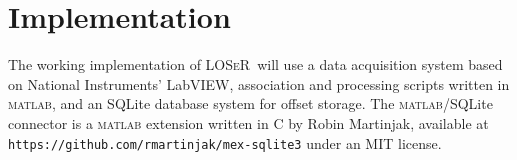 \documentclass[11pt,letterpaper]{article}
\newcommand{\loser}{\textsc{LOSeR\ }}
\begin{document}
\section{Implementation}

The working implementation of \loser will use a data acquisition system based on National Instruments' LabVIEW, association and processing scripts written in \textsc{matlab}, and an SQLite database system for offset storage. The \textsc{matlab}/SQLite connector is a \textsc{matlab} extension written in C by Robin Martinjak, available at \texttt{https://github.com/rmartinjak/mex-sqlite3} under an MIT license.
\end{document}
